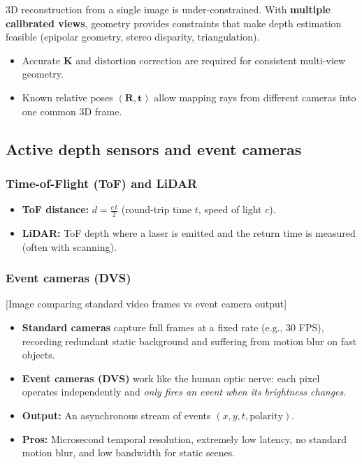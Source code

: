 \documentclass[11pt,a4paper]{article}
\newcommand{\vct}[1]{\bm{#1}}
\newcommand{\mat}[1]{\mathbf{#1}}
\begin{document}
\begin{intbox}
3D reconstruction from a single image is under-constrained.
With \textbf{multiple calibrated views}, geometry provides constraints that make depth estimation feasible
(epipolar geometry, stereo disparity, triangulation).
\end{intbox}

\begin{itemize}
  \item Accurate $\mat{K}$ and distortion correction are required for consistent multi-view geometry.
  \item Known relative poses $(\mat{R},\vct{t})$ allow mapping rays from different cameras into one common 3D frame.
\end{itemize}

\subsection{Active depth sensors and event cameras}

\subsubsection{Time-of-Flight (ToF) and LiDAR}
\begin{itemize}
  \item \textbf{ToF distance:} $d = \frac{c\,t}{2}$ (round-trip time $t$, speed of light $c$).
  \item \textbf{LiDAR:} ToF depth where a laser is emitted and the return time is measured (often with scanning).
\end{itemize}

\subsubsection{Event cameras (DVS)}
[Image comparing standard video frames vs event camera output]
\begin{itemize}
  \item \textbf{Standard cameras} capture full frames at a fixed rate (e.g., 30 FPS), recording redundant static background and suffering from motion blur on fast objects.
  \item \textbf{Event cameras (DVS)} work like the human optic nerve: each pixel operates independently and \emph{only fires an event when its brightness changes}.
  \item \textbf{Output:} An asynchronous stream of events $(x,y,t,\text{polarity})$.
  \item \textbf{Pros:} Microsecond temporal resolution, extremely low latency, no standard motion blur, and low bandwidth for static scenes.
\end{itemize}
\end{document}
